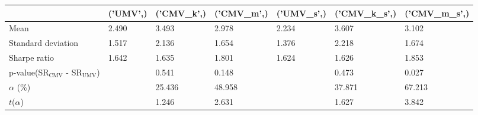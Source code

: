 \begin{tabular}{lllllll}
\toprule
 & ('UMV',) & ('CMV_k',) & ('CMV_m',) & ('UMV_s',) & ('CMV_k_s',) & ('CMV_m_s',) \\
\midrule
Mean & 2.490 & 3.493 & 2.978 & 2.234 & 3.607 & 3.102 \\
Standard deviation & 1.517 & 2.136 & 1.654 & 1.376 & 2.218 & 1.674 \\
Sharpe ratio & 1.642 & 1.635 & 1.801 & 1.624 & 1.626 & 1.853 \\
p-value(SR$_{\text{CMV}}$ - SR$_{\text{UMV}}$) &  & 0.541 & 0.148 &  & 0.473 & 0.027 \\
$\alpha$ (\%) &  & 25.436 & 48.958 &  & 37.871 & 67.213 \\
$t$($\alpha$) &  & 1.246 & 2.631 &  & 1.627 & 3.842 \\
\bottomrule
\end{tabular}
